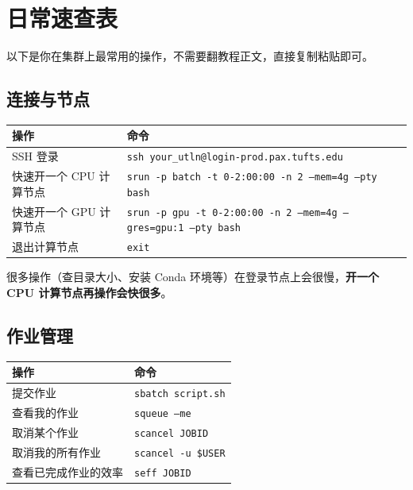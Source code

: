 \section*{日常速查表}

以下是你在集群上最常用的操作，不需要翻教程正文，直接复制粘贴即可。

\subsection*{连接与节点}

\begin{table}[h]
\centering
\small
\begin{tabular}{lp{9cm}}
\toprule
操作 & 命令 \\
\midrule
SSH 登录 & \texttt{ssh your\_utln@login-prod.pax.tufts.edu} \\
快速开一个 CPU 计算节点 & \texttt{srun -p batch -t 0-2:00:00 -n 2 --mem=4g --pty bash} \\
快速开一个 GPU 计算节点 & \texttt{srun -p gpu -t 0-2:00:00 -n 2 --mem=4g --gres=gpu:1 --pty bash} \\
退出计算节点 & \texttt{exit} \\
\bottomrule
\end{tabular}
\end{table}

\begin{tipbox}
很多操作（查目录大小、安装 Conda 环境等）在登录节点上会很慢，\textbf{开一个 CPU 计算节点再操作会快很多}。
\end{tipbox}

\subsection*{作业管理}

\begin{table}[h]
\centering
\small
\begin{tabular}{lp{9cm}}
\toprule
操作 & 命令 \\
\midrule
提交作业 & \texttt{sbatch script.sh} \\
查看我的作业 & \texttt{squeue --me} \\
取消某个作业 & \texttt{scancel JOBID} \\
取消我的所有作业 & \texttt{scancel -u \$USER} \\
查看已完成作业的效率 & \texttt{seff JOBID} \\
\bottomrule
\end{tabular}
\end{table}

